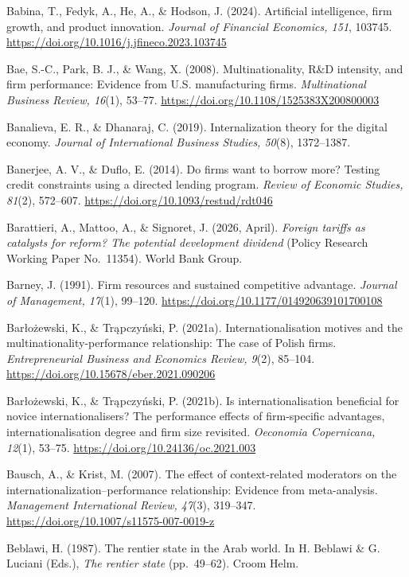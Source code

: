 \documentclass[
  a4paper,
  13pt]{extreport}
\begin{document}
Babina, T., Fedyk, A., He, A., \& Hodson, J. (2024). Artificial
intelligence, firm growth, and product innovation. \emph{Journal of
Financial Economics, 151}, 103745.
\url{https://doi.org/10.1016/j.jfineco.2023.103745}

Bae, S.-C., Park, B. J., \& Wang, X. (2008). Multinationality, R\&D
intensity, and firm performance: Evidence from U.S. manufacturing firms.
\emph{Multinational Business Review, 16}(1), 53--77.
\url{https://doi.org/10.1108/1525383X200800003}

Banalieva, E. R., \& Dhanaraj, C. (2019). Internalization theory for the
digital economy. \emph{Journal of International Business Studies,
50}(8), 1372--1387.

Banerjee, A. V., \& Duflo, E. (2014). Do firms want to borrow more?
Testing credit constraints using a directed lending program.
\emph{Review of Economic Studies, 81}(2), 572--607.
\url{https://doi.org/10.1093/restud/rdt046}

Barattieri, A., Mattoo, A., \& Signoret, J. (2026, April). \emph{Foreign
tariffs as catalysts for reform? The potential development dividend}
(Policy Research Working Paper No.~11354). World Bank Group.

Barney, J. (1991). Firm resources and sustained competitive advantage.
\emph{Journal of Management, 17}(1), 99--120.
\url{https://doi.org/10.1177/014920639101700108}

Barłożewski, K., \& Trąpczyński, P. (2021a). Internationalisation
motives and the multinationality-performance relationship: The case of
Polish firms. \emph{Entrepreneurial Business and Economics Review,
9}(2), 85--104. \url{https://doi.org/10.15678/eber.2021.090206}

Barłożewski, K., \& Trąpczyński, P. (2021b). Is internationalisation
beneficial for novice internationalisers? The performance effects of
firm-specific advantages, internationalisation degree and firm size
revisited. \emph{Oeconomia Copernicana, 12}(1), 53--75.
\url{https://doi.org/10.24136/oc.2021.003}

Bausch, A., \& Krist, M. (2007). The effect of context-related
moderators on the internationalization--performance relationship:
Evidence from meta-analysis. \emph{Management International Review,
47}(3), 319--347. \url{https://doi.org/10.1007/s11575-007-0019-z}

Beblawi, H. (1987). The rentier state in the Arab world. In H. Beblawi
\& G. Luciani (Eds.), \emph{The rentier state} (pp.~49--62). Croom Helm.
\end{document}
